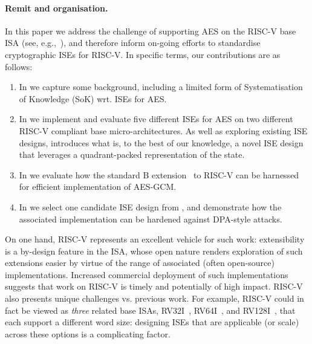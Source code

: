 
\paragraph{Remit and organisation.}

In this paper we address the challenge of supporting AES on the RISC-V base
ISA
(see, e.g.,~\cite{riscv:1,riscv:2}),
and therefore inform on-going efforts to standardise cryptographic ISEs for 
RISC-V.  In specific terms, our contributions are as follows:

\begin{enumerate}

\item In 
      we capture some background, including a limited form of
      Systematisation of Knowledge (SoK)
      wrt. ISEs for AES.

\item In 
      we implement and evaluate five different ISEs for AES on two different 
      RISC-V compliant base micro-architectures.
      As well as exploring existing ISE designs, 
      introduces what is, to the best of our knowledge, a novel ISE design 
      that leverages a quadrant-packed representation of the state.

\item In
      we evaluate how the
      standard 
      B 
      extension~\cite[Section 21]{RV:ISA:I:19}
      to RISC-V can be harnessed for efficient implementation of AES-GCM.

\item In
      we select one candidate ISE design from 
      ,
      and demonstrate how the associated implementation can be hardened
      against DPA-style attacks.

\end{enumerate}

\noindent
On one hand, 
RISC-V represents an excellent vehicle for such work:
extensibility is a by-design feature in the ISA, whose open nature renders
exploration of such extensions easier by virtue of the range of associated 
(often open-source) implementations.  
Increased commercial deployment of such implementations suggests that work 
on RISC-V is timely and potentially of high impact.
RISC-V also presents unique challenges vs. previous work.
For example,
RISC-V could in fact be viewed as {\em three} related base ISAs,
 RV32I~\cite[Section 2]{RV:ISA:I:19},
 RV64I~\cite[Section 5]{RV:ISA:I:19},
and
RV128I~\cite[Section 6]{RV:ISA:I:19},
that each support a different word size:
designing ISEs that are applicable (or scale) across these options is a
complicating factor.

%

